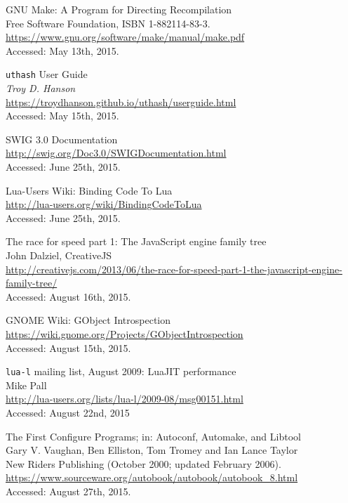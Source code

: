 \begin{thebibliography}{99}
		GNU Make: A Program for Directing Recompilation \\
		Free Software Foundation, ISBN 1-882114-83-3. \\
		\url{https://www.gnu.org/software/make/manual/make.pdf} \\
		Accessed: May 13th, 2015.

		\verb|uthash| User Guide \\
		\emph{Troy D. Hanson} \\
		\url{https://troydhanson.github.io/uthash/userguide.html} \\
		Accessed: May 15th, 2015.

		SWIG 3.0 Documentation \\
		\url{http://swig.org/Doc3.0/SWIGDocumentation.html} \\
		Accessed: June 25th, 2015.

		Lua-Users Wiki: Binding Code To Lua \\
		\url{http://lua-users.org/wiki/BindingCodeToLua} \\
		Accessed: June 25th, 2015.

		The race for speed part 1: The JavaScript engine family tree \\
		John Dalziel, CreativeJS \\
		\url{http://creativejs.com/2013/06/the-race-for-speed-part-1-the-javascript-engine-family-tree/} \\
		Accessed: August 16th, 2015.

		GNOME Wiki: GObject Introspection \\
		\url{https://wiki.gnome.org/Projects/GObjectIntrospection} \\
		Accessed: August 15th, 2015.

		\verb|lua-l| mailing list, August 2009: LuaJIT performance \\
		Mike Pall \\
		\url{http://lua-users.org/lists/lua-l/2009-08/msg00151.html} \\
		Accessed: August 22nd, 2015

		The First Configure Programs; in: Autoconf, Automake, and Libtool \\
		Gary V. Vaughan, Ben Elliston, Tom Tromey and Ian Lance Taylor \\
		New Riders Publishing (October 2000; updated February 2006). \\
		\url{https://www.sourceware.org/autobook/autobook/autobook_8.html} \\
		Accessed: August 27th, 2015.

\end{thebibliography}

